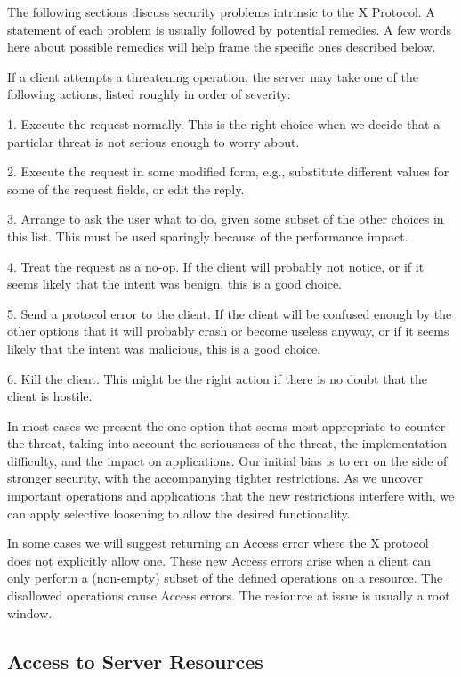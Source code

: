\documentclass{article}
\begin{document}
The following sections discuss security problems intrinsic to the X
Protocol.  A statement of each problem is usually followed by
potential remedies.  A few words here about possible remedies will
help frame the specific ones described below.

If a client attempts a threatening operation, the server may take one
of the following actions, listed roughly in order of severity:

1. Execute the request normally.  This is the right choice when we
decide that a particlar threat is not serious enough to worry about.

2. Execute the request in some modified form, e.g., substitute
different values for some of the request fields, or edit the reply.

3. Arrange to ask the user what to do, given some subset of the other
choices in this list.  This must be used sparingly because of the
performance impact.

4. Treat the request as a no-op.  If the client will probably not
notice, or if it seems likely that the intent was benign, this is a
good choice.
 
5. Send a protocol error to the client.  If the client will be
confused enough by the other options that it will probably crash or
become useless anyway, or if it seems likely that the intent was
malicious, this is a good choice.

6. Kill the client.  This might be the right action if there is no
doubt that the client is hostile.

In most cases we present the one option that seems most appropriate to
counter the threat, taking into account the seriousness of the threat,
the implementation difficulty, and the impact on applications.  Our
initial bias is to err on the side of stronger security, with the
accompanying tighter restrictions.  As we uncover important operations
and applications that the new restrictions interfere with, we can apply
selective loosening to allow the desired functionality.

In some cases we will suggest returning an Access error where the X
protocol does not explicitly allow one.  These new Access errors arise
when a client can only perform a (non-empty) subset of the defined
operations on a resource.  The disallowed operations cause Access
errors.  The resiource at issue is usually a root window.



\subsection{Access to Server Resources}
\end{document}

